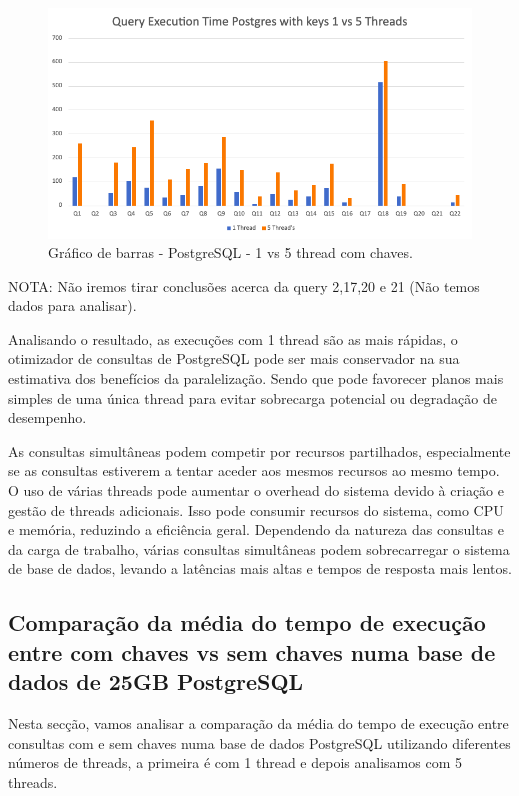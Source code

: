 \documentclass{article}
\begin{document}
  \begin{figure}[H]
    \centering
    \includegraphics[width=\textwidth]{Graphs/postgres_withkeys_1vs5.png}
    \caption{Gráfico de barras - PostgreSQL - 1 vs 5 thread com chaves.} 
    \label{fig:PKCreation2}
  \end{figure}

  NOTA: Não iremos tirar conclusões acerca da query 2,17,20 e 21 (Não temos dados para analisar).

Analisando o resultado, as execuções com 1 thread são as mais rápidas, o otimizador de consultas de PostgreSQL pode ser mais conservador na sua estimativa dos benefícios da paralelização. Sendo que pode favorecer planos mais simples de uma única thread para evitar sobrecarga potencial ou degradação de desempenho.
  
  
  
\texttt{}\par As consultas simultâneas podem competir por recursos partilhados, especialmente se as consultas estiverem a tentar aceder aos mesmos recursos ao mesmo tempo.
O uso de várias threads pode aumentar o overhead do sistema devido à criação e gestão de threads adicionais. Isso pode consumir recursos do sistema, como CPU e memória, reduzindo a eficiência geral. 
Dependendo da natureza das consultas e da carga de trabalho, várias consultas simultâneas podem sobrecarregar o sistema de base de dados, levando a latências mais altas e tempos de resposta mais lentos. 
 




\clearpage
\subsection{Comparação da média do tempo de execução entre com chaves vs sem chaves numa base de dados de 25GB PostgreSQL}
\texttt{}\par Nesta secção, vamos analisar a comparação da média do tempo de execução entre consultas com e sem chaves numa base de dados PostgreSQL utilizando diferentes números de threads, a primeira é com 1 thread e depois analisamos com 5 threads.
\end{document}
